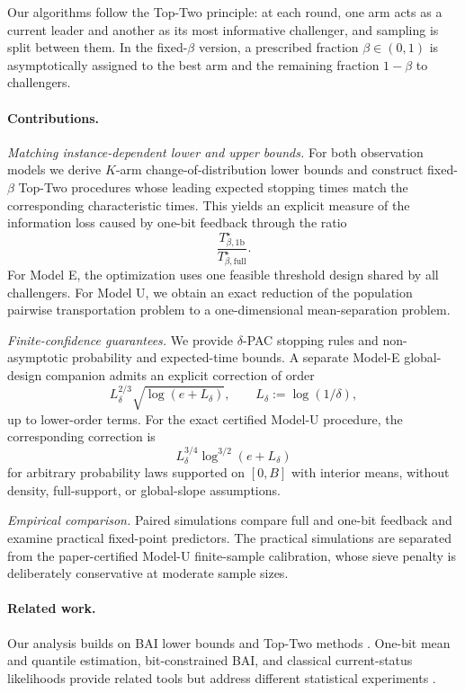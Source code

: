 \documentclass[twoside]{article}
\theoremstyle{definition}
\newcommand{\1}{\mathbf 1}
\begin{document}
Our algorithms follow the Top-Two principle: at each round, one arm acts as a
current leader and another as its most informative challenger, and sampling is
split between them. In the fixed-$\beta$ version, a prescribed fraction
$\beta\in(0,1)$ is asymptotically assigned to the best arm and the remaining
fraction $1-\beta$ to challengers.

\paragraph{Contributions.}
\emph{Matching instance-dependent lower and upper bounds.}
For both observation models we derive $K$-arm change-of-distribution lower
bounds and construct fixed-$\beta$ Top-Two procedures whose leading expected
stopping times match the corresponding characteristic times. This yields an
explicit measure of the information loss caused by one-bit feedback through
the ratio
\[
\frac{T_{\beta,\mathrm{1b}}^\star}
     {T_{\beta,\mathrm{full}}^\star}.
\]
For Model E, the optimization uses one feasible threshold design shared by all
challengers. For Model U, we obtain an exact reduction of the population
pairwise transportation problem to a one-dimensional mean-separation problem.

\emph{Finite-confidence guarantees.}
We provide $\delta$-PAC stopping rules and non-asymptotic probability and
expected-time bounds. A separate Model-E global-design companion admits an
explicit correction of order
\[
L_\delta^{2/3}\sqrt{\log(e+L_\delta)},
\qquad
L_\delta:=\log(1/\delta),
\]
up to lower-order terms. For the exact certified Model-U procedure, the
corresponding correction is
\[
L_\delta^{3/4}\log^{3/2}(e+L_\delta)
\]
for arbitrary probability laws supported on $[0,B]$ with interior means,
without density, full-support, or global-slope assumptions.

\emph{Empirical comparison.}
Paired simulations compare full and one-bit feedback and examine practical
fixed-point predictors. The practical simulations are separated from the
paper-certified Model-U finite-sample calibration, whose sieve penalty is
deliberately conservative at moderate sample sizes.

\paragraph{Related work.}
Our analysis builds on BAI lower bounds and Top-Two methods
\cite{KCG2016,Russo2016,Jourdan2022,DKM2019}. One-bit mean and
quantile estimation, bit-constrained BAI, and classical current-status
likelihoods provide related tools but address different statistical
experiments \cite{KipnisDuchi2022,LauScarlett2026AISTATS,
LauScarlett2026Tail,Faizal2023ICQ,LauScarlett2025,
GroeneboomWellner1992,GMW2008}.
\end{document}
